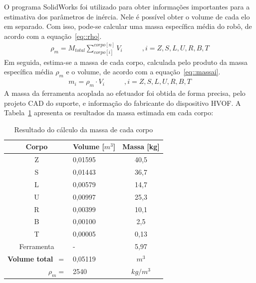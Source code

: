 O programa SolidWorks foi utilizado para obter informações importantes para a
estimativa dos parâmetros de inércia. Nele é possível obter o volume de cada elo
em separado. Com isso, pode-se calcular uma massa específica média do robô, de
acordo com a equação~\ref{eq::rho}.
\begin{align}
	\rho_{m} = M_{total}\sum_{corpo[i]}^{corpo[n]} V_{i} \label{eq::rho} \qquad & ,
	i = Z,S,L,U,R,B,T
\end{align}
%
Em seguida, estima-se a massa de cada corpo, calculada pelo produto da massa
específica média $\rho_{m}$ e o volume, de acordo com a
equação~\ref{eq::massai}.
%
\begin{align}
	m_{i} = \rho_{m} \cdot V_{i} \label{eq::massai} \qquad &, i =
	Z,S,L,U,R,B,T
\end{align}
%
A massa da ferramenta acoplada ao efetuador foi obtida de forma precisa,
pelo projeto CAD do suporte, e informação do fabricante do dispositivo
HVOF.
A Tabela~\ref{tab::massa_mh12} apresenta os resultados da massa estimada em cada
corpo:
%
\begin{table}[h]
\centering
\caption{Resultado do cálculo da massa de cada corpo}
\label{tab::massa_mh12}
\begin{tabular}{@{}clc@{}}
\toprule
\textbf{Corpo}                      & \textbf{Volume} [$m^3$] & \multicolumn{1}{l}{\textbf{Massa} [kg]} \\ \midrule 
Z 									& 0,01595         & 40,5							   \\
S                                   & 0,01443         & 36,7                               \\
L                                   & 0,00579         & 14,7                               \\
U                                   & 0,00997         & 25,3                               \\
R                                   & 0,00399         & 10,1                               \\
B                                   & 0,00100         & 2,5                                \\
T                                   & 0,00005         & 0,13                               \\
Ferramenta                          & -		          & 5,97							   \\ \midrule
\textbf{Volume total}~$=$           & 0,05119        & \multicolumn{1}{c}{$m^3$}	       \\
\multicolumn{1}{r}{\textbf{$\rho_m =$}} & 2540          &
\multicolumn{1}{c}{$kg/{m^3}$}     \\ \bottomrule
\end{tabular}
\end{table}
%

